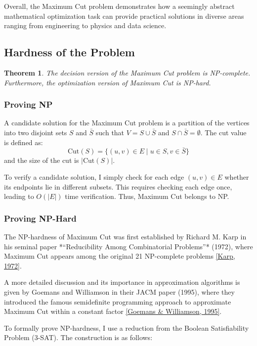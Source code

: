 \documentclass[12pt]{article}
\begin{document}
Overall, the Maximum Cut problem demonstrates how a seemingly abstract mathematical 
optimization task can provide practical solutions in diverse areas ranging from 
engineering to physics and data science.

\subsection{Hardness of the Problem}
\newtheorem{theorem}{Theorem}
\begin{theorem}
The decision version of the Maximum Cut problem is NP-complete. 
Furthermore, the optimization version of Maximum Cut is NP-hard.
\end{theorem}

\subsubsection{Proving NP}
A candidate solution for the Maximum Cut problem is a partition of the
vertices into two disjoint sets $S$ and $\bar{S}$ such that $V = S \cup \bar{S}$ and $S \cap \bar{S} = \emptyset$. 
The cut value is defined as:
\[
\text{Cut}(S) = \{ (u,v) \in E \mid u \in S, v \in \bar{S} \}
\]
and the size of the cut is $|\text{Cut}(S)|$.

To verify a candidate solution, I simply check for each edge $(u,v) \in E$
whether its endpoints lie in different subsets. This requires checking each edge once,
leading to $O(|E|)$ time verification. Thus, Maximum Cut belongs to NP.

\subsubsection{Proving NP-Hard}
The NP-hardness of Maximum Cut was first established by Richard M. Karp in his 
seminal paper *“Reducibility Among Combinatorial Problems”* (1972), where Maximum Cut 
appears among the original 21 NP-complete problems 
\href{https://www.cs.cornell.edu/courses/cs722/2000sp/karp.pdf}{[Karp, 1972]}.

A more detailed discussion and its importance in approximation algorithms 
is given by Goemans and Williamson in their JACM paper (1995), where 
they introduced the famous semidefinite programming approach to approximate 
Maximum Cut within a constant factor 
\href{https://math.mit.edu/~goemans/PAPERS/maxcut-jacm.pdf}{[Goemans \& Williamson, 1995]}.

To formally prove NP-hardness, I use a reduction from the Boolean Satisfiability Problem (3-SAT). 
The construction is as follows:
\end{document}
